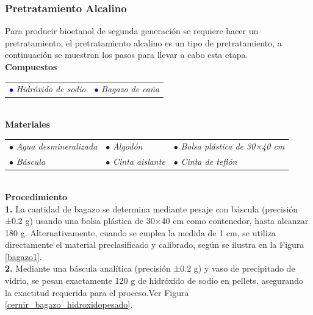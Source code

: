 \documentclass[12pt]{article}
\begin{document}
			
			
						\subsubsection{Pretratamiento Alcalino}
	Para producir bioetanol de segunda generación se requiere hacer un pretratamiento, el pretratamiento alcalino es un tipo de pretratamiento, a continuación se muestran los pasos para llevar a cabo esta etapa.		
		\\[1 em]
			\textbf{Compuestos} 
			\\[0.5em]
			
			\begin{tabular}{p{0.3\textwidth}p{}}
		\textcolor{blue}{$\bullet$} \textit{Hidróxido de sodio} &	\textcolor{blue}{$\bullet$}\textit{ Bagazo de caña} 
			\end{tabular} \\[ 1em]
			
		
		
			\textbf{Materiales} 
			\\[1 em]
					
\begin{tabular}{p{}p{}p{}}
	$\bullet$ \textit{Agua desmineralizada }& $\bullet$ \textit{Algodón }& $\bullet$ \textit{Bolsa plástica de 30×40 cm} \\
	$\bullet$ \textit{Báscula} & $\bullet$ \textit{Cinta aislante} & $\bullet$ \textit{Cinta de teflón}
\end{tabular}
\\[0.5em]


\textbf{Procedimiento}
\\[0.5em]
	
			\textbf{1.}	La cantidad de bagazo se determina mediante pesaje con báscula (precisión ±0.2 g) usando una bolsa plástica de 30×40 cm como contenedor, hasta alcanzar 180 g. Alternativamente, cuando se emplea la medida de 1 cm, se utiliza directamente el material preclasificado y calibrado, según se ilustra en la Figura \ref{bagazo1}.\\
					
			\textbf{2.} Mediante una báscula analítica (precisión ±0.2 g) y vaso de precipitado de vidrio, se pesan exactamente 120 g de hidróxido de sodio en pellets, asegurando la exactitud requerida para el proceso.Ver Figura \ref{cernir_bagazo_hidroxidopesado}.
\end{document}
